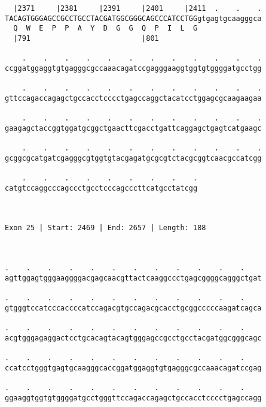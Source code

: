 \documentclass{article}
\begin{document}
\begin{Verbatim}
  |2371     |2381     |2391     |2401     |2411  .    .    .
TACAGTGGGAGCCGCCTGCCTACGATGGCGGGCAGCCCATCCTGGgtgagtgcaagggca
  Q  W  E  P  P  A  Y  D  G  G  Q  P  I  L  G               
  |791                          |801                        
  
    .    .    .    .    .    .    .    .    .    .    .    .
ccggatggaggtgtgagggcgccaaacagatccgagggaaggtggtgtggggatgcctgg
                                                            
    .    .    .    .    .    .    .    .    .    .    .    .
gttccagaccagagctgccacctcccctgagccaggctacatcctggagcgcaagaagaa
                                                            
    .    .    .    .    .    .    .    .    .    .    .    .
gaagagctaccggtggatgcggctgaacttcgacctgattcaggagctgagtcatgaagc
                                                            
    .    .    .    .    .    .    .    .    .    .    .    .
gcggcgcatgatcgagggcgtggtgtacgagatgcgcgtctacgcggtcaacgccatcgg
                                                            
    .    .    .    .    .    .    .    .    .
catgtccaggcccagccctgcctcccagcccttcatgcctatcgg
                                             
                                             
 
Exon 25 | Start: 2469 | End: 2657 | Length: 188



.    .    .    .    .    .    .    .    .    .    .    .    
agttggagtgggaaggggacgagcaacgttactcaaggccctgagcggggcagggctgat
                                                            
.    .    .    .    .    .    .    .    .    .    .    .    
gtgggtccatcccaccccatccagacgtgccagacgcacctgcggcccccaagatcagca
                                                            
.    .    .    .    .    .    .    .    .    .    .    .    
acgtgggagaggactcctgcacagtacagtgggagccgcctgcctacgatggcgggcagc
                                                            
.    .    .    .    .    .    .    .    .    .    .    .    
ccatcctgggtgagtgcaagggcaccggatggaggtgtgagggcgccaaacagatccgag
                                                            
.    .    .    .    .    .    .    .    .    .    .    .    
ggaaggtggtgtggggatgcctgggttccagaccagagctgccacctcccctgagccagg
                                                            

\end{Verbatim}
\end{document}

